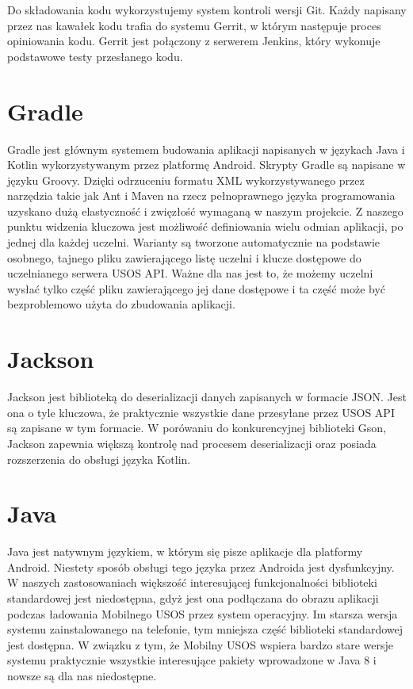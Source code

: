 \documentclass{pracamgr}
\begin{document}
Do składowania kodu wykorzystujemy system kontroli wersji Git. Każdy napisany
przez nas kawałek kodu trafia do systemu Gerrit, w którym następuje proces
opiniowania kodu. Gerrit jest połączony z serwerem Jenkins, który wykonuje
podstawowe testy przesłanego kodu.

\section{Gradle}

Gradle jest głównym systemem budowania aplikacji napisanych w językach Java i
Kotlin wykorzystywanym przez platformę Android. Skrypty Gradle są napisane w
języku Groovy. Dzięki odrzuceniu formatu XML wykorzystywanego przez narzędzia
takie jak Ant i Maven na rzecz pełnoprawnego języka programowania uzyskano dużą
elastyczność i zwięzłość wymaganą w naszym projekcie. Z naszego punktu widzenia
kluczowa jest możliwość definiowania wielu odmian aplikacji, po jednej dla każdej
uczelni. Warianty są tworzone automatycznie na podstawie osobnego, tajnego pliku
zawierającego listę uczelni i klucze dostępowe do uczelnianego serwera USOS API.
Ważne dla nas jest to, że możemy uczelni wysłać tylko część pliku zawierającego
jej dane dostępowe i ta część może być bezproblemowo użyta do zbudowania aplikacji.

\section{Jackson}

Jackson jest biblioteką do deserializacji danych zapisanych w formacie JSON.
Jest ona o tyle kluczowa, że praktycznie wszystkie dane przesyłane przez USOS API
są zapisane w tym formacie. W porówaniu do konkurencyjnej biblioteki Gson, Jackson
zapewnia większą kontrolę nad procesem deserializacji oraz posiada rozszerzenia
do obsługi języka Kotlin.

\section{Java}

Java jest natywnym językiem, w którym się pisze aplikacje dla platformy Android.
Niestety sposób obsługi tego języka przez Androida jest dysfunkcyjny. W naszych
zastosowaniach większość interesującej funkcjonalności biblioteki standardowej
jest niedostępna, gdyż jest ona podłączana do obrazu aplikacji podczas ładowania
Mobilnego USOS przez system operacyjny. Im starsza wersja systemu zainstalowanego
na telefonie, tym mniejsza część biblioteki standardowej jest dostępna. W związku
z tym, że Mobilny USOS wspiera bardzo stare wersje systemu praktycznie wszystkie
interesujące pakiety wprowadzone w Java 8 i nowsze są dla nas niedostępne.
\end{document}
